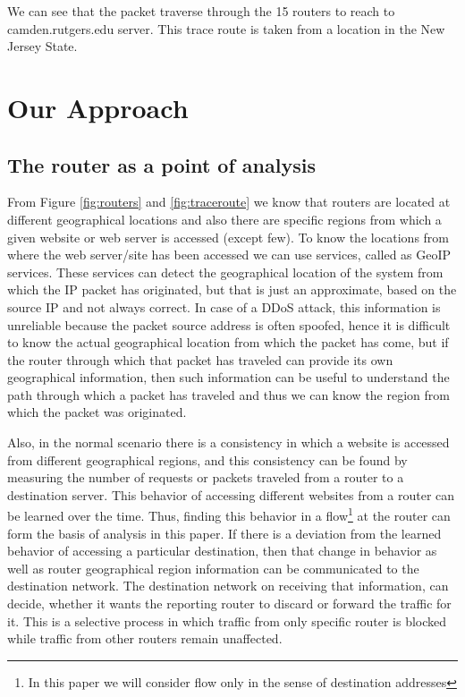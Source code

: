 \documentclass[12pt,oneside,a4paper]{article}
\begin{document}
We can see that the packet traverse through the 15 routers to reach to camden.rutgers.edu server. This trace route is taken from a location in the New Jersey State.\par
\pagebreak
\section{Our Approach}

\subsection{The router as a point of analysis}
From Figure \ref{fig:routers} and \ref{fig:traceroute} we know that routers are located at different geographical locations and also there are specific regions from which a given website or web server is accessed (except few). To know the locations from where the web server/site has been accessed we can use services, called as GeoIP services. These services can detect the geographical location of the system from which the IP packet has originated, but that is just an approximate, based on the source IP and not always correct. In case of a DDoS attack, this information is unreliable because the packet source address is often spoofed, hence it is difficult to know the actual geographical location from which the packet has come, but if the router through which that packet has traveled can provide its own geographical information, then such information can be useful to understand the path through which a packet has traveled and thus we can know the region from which the packet was originated.\par

Also, in the normal scenario there is a consistency in which a website is accessed from different geographical regions, and this consistency can be found by measuring the number of requests or packets traveled from a router to a destination server. This behavior of accessing different websites from a router can be learned over the time. Thus, finding this behavior in a flow\footnote{In this paper we will consider flow only in the sense of destination addresses} at the router can form the basis of analysis in this paper. If there is a deviation from the learned behavior of accessing a particular destination, then that change in behavior as well as router geographical region information can be communicated to the destination network. The destination network on receiving that information, can decide, whether it wants the reporting router to discard or forward the traffic for it. This is a selective process in which traffic from only specific router is blocked while traffic from other routers remain unaffected.
\end{document}
